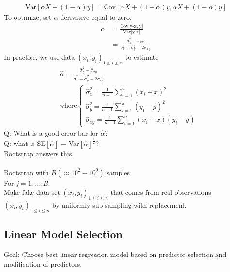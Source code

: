 \documentclass[12pt, letterpaper]{article}
\begin{document}
\begin{enumerate}
    \begin{align*}
        \text{Var}\left[ \alpha X + (1-\alpha)y \right] = \text{Cov}[\alpha X + (1-\alpha)y, \alpha X + (1-\alpha)y] 
    \end{align*}
    To optimize, set $\alpha$ derivative equal to zero.
    \begin{align*}
        \alpha &= \frac{\text{Cov[y-x,\ y]}}{\text{Var[y-x]}} \\
        &= \frac{\sigma^2_y - \sigma_{xy}}{\sigma_x^2 + \sigma_y^2 -2\sigma_{xy}}
    \end{align*}
    In practice, we use data $(x_i, y_i)_{1\le i \le n}$ to estimate 
    \begin{align*}
        &\hat \alpha = \frac{\hat \sigma_y^2 - \hat \sigma_{xy}}{\hat \sigma_x^2+\hat \sigma_y^2-2\hat\sigma_{xy}} \\
        & \text{where} \begin{cases}
            \hat \sigma_x^2  = \frac 1{n-1} \sum_{i=1}^{n}(x_i-\bar x)^2\\
            \hat \sigma_y^2  = \frac 1{n-1} \sum_{i=1}^{n}(y_i-\bar y)^2\\
            \hat \sigma_{xy} = \frac 1{n-1} \sum_{i=1}^{n}(x_i-\bar x)(y_i-\bar y)
        \end{cases}
    \end{align*}
    Q: What is a good error bar for $\hat \alpha$? \\
    Q: what is SE$[\hat \alpha]$ = Var$[\hat \alpha]^\frac12$? \\
    Bootstrap answers this. \\ \\
    \underline{Bootstrap with $B (\approx 10^2 - 10^9)$ samples}\\
    For $j = 1,...,B$: \\
    Make fake data set $(\tilde x_i, \tilde y_i)_{1\le i \le n}$ that comes from real
    observations $(x_i, y_i)_{1 \le i \le n}$ by uniformly sub-sampling \underline{with replacement}.
\end{enumerate}

\subsection{Linear Model Selection}
Goal: Choose best linear regression model based on predictor selection and modification of predictors.\\ \\
\end{document}
